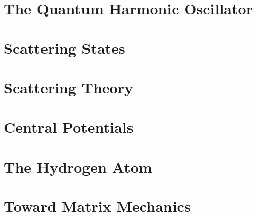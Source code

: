 \documentclass[12pt]{report}
\begin{document}
    \chapter{The Quantum Harmonic Oscillator} 
    

    \chapter{Scattering States}
    
    
    \chapter{Scattering Theory}
    

    \chapter{Central Potentials}
    

    \chapter{The Hydrogen Atom}
    

    \chapter{Toward Matrix Mechanics}
    
    
\end{document}
